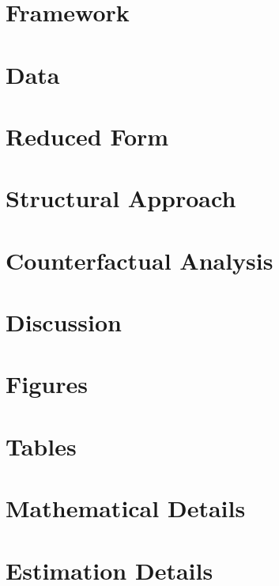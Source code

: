 \documentclass[11pt]{report}
\begin{document}
\section{Framework}\label{sec:dsc-framework}


\section{Data}\label{sec:pg-data}


\section{Reduced Form}\label{sec:dsc-reduced}


\section{Structural Approach}\label{sec:dsc-structural}


\section{Counterfactual Analysis}\label{sec:dsc-counterfactual}


\section{Discussion}\label{sec:dsc-discussion}


\clearpage
\begin{subappendices}
\section{Figures}\label{app:dsc-figures}


\clearpage
\section{Tables}\label{app:dsc-tables}


\clearpage
\section{Mathematical Details}\label{app:dsc-math}


\clearpage
\section{Estimation Details}\label{app:dsc-estimation}


\end{subappendices}
\end{document}
